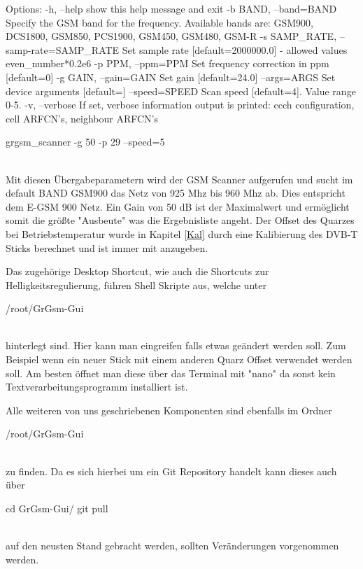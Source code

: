 \begin{code}
Options:
  -h, --help            show this help message and exit
  -b BAND, --band=BAND  Specify the GSM band for the frequency. Available
                        bands are: GSM900, DCS1800, GSM850, PCS1900, GSM450,
                        GSM480, GSM-R
  -s SAMP_RATE, --samp-rate=SAMP_RATE
                        Set sample rate [default=2000000.0] - allowed values
                        even_number*0.2e6
  -p PPM, --ppm=PPM     Set frequency correction in ppm [default=0]
  -g GAIN, --gain=GAIN  Set gain [default=24.0]
  --args=ARGS           Set device arguments [default=]
  --speed=SPEED         Scan speed [default=4]. Value range 0-5.
  -v, --verbose         If set, verbose information output is printed: ccch
                        configuration, cell ARFCN's, neighbour ARFCN's
                        
                   
grgsm_scanner -g 50 -p 29 --speed=5
\end{code}
\noindent\\Mit diesen Übergabeparametern wird der \ac{GSM} Scanner aufgerufen und sucht im default BAND GSM900 das Netz von 925 Mhz bis 960 Mhz ab. Dies entspricht dem E-GSM 900 Netz. Ein Gain von 50 dB ist der Maximalwert und ermöglicht somit die größte "Ausbeute" was die Ergebnisliste angeht. Der Offset des Quarzes bei Betriebstemperatur wurde in Kapitel \ref{Kal} durch eine Kalibierung des DVB-T Sticks berechnet und ist immer mit anzugeben. 

Das zugehörige Desktop Shortcut, wie auch die Shortcuts zur Helligkeitsregulierung, führen Shell Skripte aus, welche unter 
\begin{code}
/root/GrGsm-Gui
\end{code}
\noindent\\hinterlegt sind. Hier kann man eingreifen falls etwas geändert werden soll. Zum Beispiel wenn ein neuer Stick mit einem anderen Quarz Offset verwendet werden soll. Am besten öffnet man diese über das Terminal mit "nano" da sonst kein Textverarbeitungsprogramm installiert ist. 

Alle weiteren von uns geschriebenen Komponenten sind ebenfalls im Ordner 
\begin{code}
/root/GrGsm-Gui
\end{code}
\noindent\\zu finden. Da es sich hierbei um ein Git Repository handelt kann dieses auch über 
\begin{code}
cd GrGsm-Gui/
git pull
\end{code}
\noindent\\auf den neusten Stand gebracht werden, sollten Veränderungen vorgenommen werden. 

